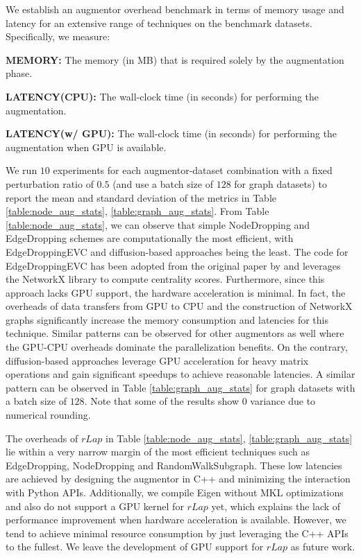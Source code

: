 \documentclass{article}
\theoremstyle{plain}
\theoremstyle{definition}
\theoremstyle{remark}
\begin{document}
We establish an augmentor overhead benchmark in terms of memory usage and latency for an extensive range of techniques on the benchmark datasets. Specifically, we measure:

\textbf{MEMORY:} The memory (in MB) that is required solely by the augmentation phase.

\textbf{LATENCY(CPU):} The wall-clock time (in seconds) for performing the augmentation.

\textbf{LATENCY(w/ GPU):} The wall-clock time (in seconds) for performing the augmentation when GPU is available.

We run $10$ experiments for each augmentor-dataset combination with a fixed perturbation ratio of $0.5$ (and use a batch size of $128$ for graph datasets) to report the mean and standard deviation of the metrics in Table \ref{table:node_aug_stats}, \ref{table:graph_aug_stats}. From Table \ref{table:node_aug_stats}, we can observe that simple NodeDropping and EdgeDropping schemes are computationally the most efficient, with EdgeDroppingEVC and diffusion-based approaches being the least. The code for EdgeDroppingEVC has been adopted from the original paper by \citet{zhu2021graph} and leverages the NetworkX library to compute centrality scores. Furthermore, since this approach lacks GPU support, the hardware acceleration is minimal. In fact, the overheads of data transfers from GPU to CPU and the construction of NetworkX graphs significantly increase the memory consumption and latencies for this technique. Similar patterns can be observed for other augmentors as well where the GPU-CPU overheads dominate the parallelization benefits. On the contrary, diffusion-based approaches leverage GPU acceleration for heavy matrix operations and gain significant speedups to achieve reasonable latencies. A similar pattern can be observed in Table \ref{table:graph_aug_stats} for graph datasets with a batch size of $128$. Note that some of the results show $0$ variance due to numerical rounding.

The overheads of $rLap$ in Table \ref{table:node_aug_stats}, \ref{table:graph_aug_stats} lie within a very narrow margin of the most efficient techniques such as EdgeDropping, NodeDropping and RandomWalkSubgraph. These low latencies are achieved by designing the augmentor in C++ and minimizing the interaction with Python APIs. Additionally, we compile Eigen without MKL optimizations and also do not support a GPU kernel for $rLap$ yet, which explains the lack of performance improvement when hardware acceleration is available. However, we tend to achieve minimal resource consumption by just leveraging the C++ APIs to the fullest. We leave the development of GPU support for $rLap$ as future work.
\end{document}
